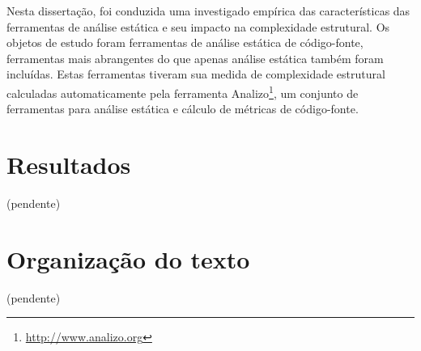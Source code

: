 Nesta dissertação, foi conduzida uma investigado empírica das características
das ferramentas de análise estática e seu impacto na complexidade estrutural.
Os objetos de estudo foram ferramentas de análise estática de código-fonte,
ferramentas mais abrangentes do que apenas análise estática também foram
incluídas.  Estas ferramentas tiveram sua medida de complexidade estrutural
calculadas automaticamente pela ferramenta
Analizo\footnote{\url{http://www.analizo.org}}, um conjunto de ferramentas para
análise estática e cálculo de métricas de código-fonte.

\section{Resultados}

(pendente)

\section{Organização do texto}

(pendente)
